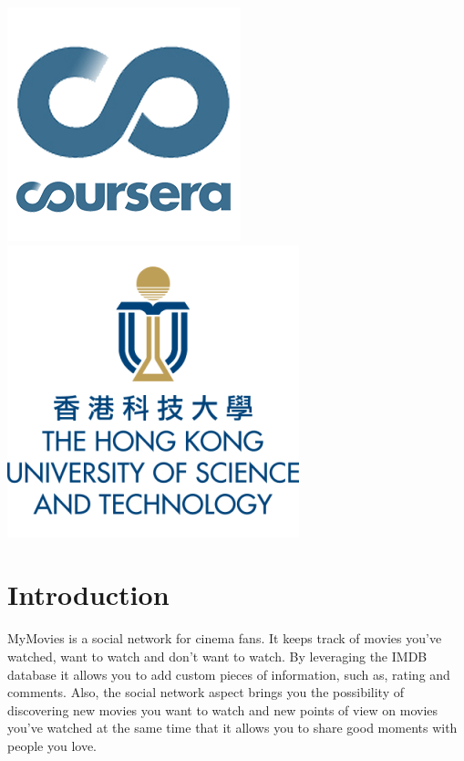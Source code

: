 \begin{titlepage}
\vfill
\includegraphics[width=.2\paperwidth]{fig/coursera.png}
\hspace{2cm}
\includegraphics[width=.2\paperwidth]{fig/hkust.png}

\end{titlepage}

\tableofcontents
\newpage

\section{Introduction}

MyMovies is a social network for cinema fans. It keeps track of movies you've
watched, want to watch and don't want to watch. By leveraging the IMDB database
it allows you to add custom pieces of information, such as, rating and
comments. Also, the social network aspect brings you the possibility of
discovering new movies you want to watch and new points of view on movies
you've watched at the same time that it allows you to share good moments with
people you love.

